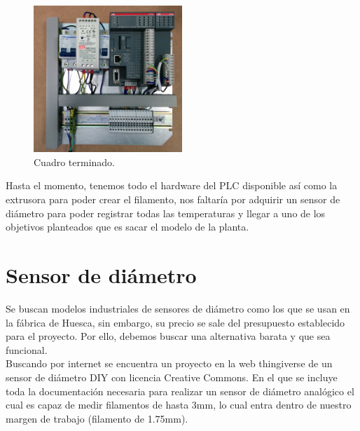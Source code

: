     \begin{figure}[H]
            \centering
            \includegraphics[width=0.5\textwidth]{images/cuadro/IMG_20150331_114950.jpg}
            \caption{Cuadro terminado.}
            \label{fig:cuad_montaje7}
    \end{figure}

Hasta el momento, tenemos todo el hardware del PLC disponible así como la extrusora para poder crear el filamento, nos faltaría por adquirir un sensor de diámetro para poder registrar todas las temperaturas y llegar a uno de los objetivos planteados que es sacar el modelo de la planta.\\

\section{Sensor de diámetro}
\label{sec:sensor}

Se buscan modelos industriales de sensores de diámetro como los que se usan en la fábrica de Huesca, sin embargo, su precio se sale del presupuesto establecido para el proyecto. Por ello, debemos buscar una alternativa barata y que sea funcional.\\

Buscando por internet se encuentra un proyecto en la web thingiverse \cite{thing_filamento} de un sensor de diámetro DIY con licencia Creative Commons. En el que se incluye toda la documentación necesaria para realizar un sensor de diámetro analógico el cual es capaz de medir filamentos de hasta 3mm, lo cual entra dentro de nuestro margen de trabajo (filamento de 1.75mm).\\


